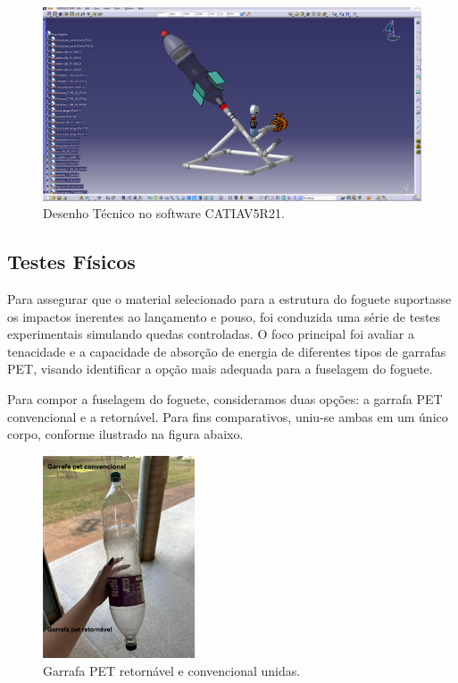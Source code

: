 \begin{figure}[H]
	\centering
	\includegraphics[width=1\textwidth,height=\textheight,keepaspectratio]{figuras/estruturas/desenho_tecnico_catia.png}
	\caption{Desenho Técnico no software CATIAV5R21.}
	\label{fig_desenho_tecnico_catia}
\end{figure}

\subsection{Testes Físicos}

Para assegurar que o material selecionado para a estrutura do foguete suportasse os impactos inerentes ao lançamento e pouso, foi conduzida uma série de testes experimentais simulando quedas controladas. O foco principal foi avaliar a tenacidade e a capacidade de absorção de energia de diferentes tipos de garrafas PET, visando identificar a opção mais adequada para a fuselagem do foguete. 

Para compor a fuselagem do foguete, consideramos duas opções: a garrafa PET convencional e a retornável. Para fins comparativos, uniu-se ambas em um único corpo, conforme ilustrado na figura abaixo. 

\begin{figure}[H]
	\centering
	\includegraphics[width=0.4\textwidth,height=\textheight,keepaspectratio]{figuras/estruturas/retornavel_pet.png}
	\caption{Garrafa PET retornável e convencional unidas.}
	\label{fig_garrafa_pet_unidas}
\end{figure}

